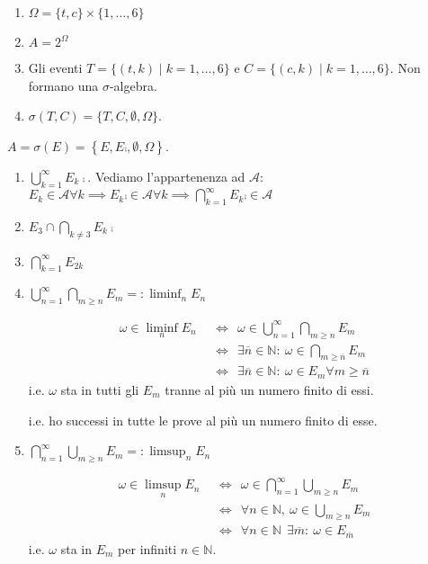 \Soluzione
\begin{enumerate}
\item $\Omega =\{t,c\} \times \{1,\dots ,6\}$
\item $A=2^{\Omega }$
\item Gli eventi $T=\{( t,k) \mid k=1,\dots ,6\}$ e $C=\{( c,k) \mid k=1,\dots ,6\}$. Non formano una $\sigma $-algebra.
\item $\sigma ( T,C) =\{T,C,\emptyset ,\Omega \}$.
\end{enumerate}
\Soluzione

$A=\sigma ( E) =\left\{E,E\comp ,\emptyset ,\Omega \right\}$.
\Soluzione
\begin{enumerate}
\item $\bigcup\limits _{k=1}^{\infty } E_{k}\comp$. Vediamo l'appartenenza ad $\mathcal{A}$: $E_{k} \in \mathcal{A} \forall k\implies  E_{k}\comp \in \mathcal{A} \forall k\implies  \bigcap\limits _{k=1}^{\infty } E_{k}\comp \in \mathcal{A}$
\item $E_{3} \cap \bigcap\limits _{k\neq 3} E_{k}\comp$
\item $\bigcap\limits _{k=1}^{\infty } E_{2k}$
\item $\bigcup\limits _{n=1}^{\infty }\bigcap\limits _{m\geq n} E_{m} =:\liminf _{n} E_{n}$

\begin{oss}
\begin{equation*}
\begin{aligned}
\omega \in \liminf _{n} E_{n} & \ \ \iff \ \ \omega \in \bigcup _{n=1}^{\infty }\bigcap _{m\geq n} E_{m}\\
 & \ \ \iff \ \ \exists \overline{n} \in \mathbb{N} :\ \omega \in \bigcap _{m\geq \overline{n}} E_{m}\\
 & \ \ \iff \ \ \exists \overline{n} \in \mathbb{N} :\ \omega \in E_{m} \forall m\geq \overline{n}
\end{aligned}
\end{equation*}
i.e. $\omega $ sta in tutti gli $E_{m}$ tranne al più un numero finito di essi.

i.e. ho successi in tutte le prove al più un numero finito di esse.
\end{oss}
\item $\bigcap\limits _{n=1}^{\infty }\bigcup\limits _{m\geq n} E_{m} =:\limsup _{n} E_{n}$

\begin{oss}
\begin{equation*}
\begin{aligned}
\omega \in \limsup _{n} E_{n} & \ \ \iff \ \ \omega \in \bigcap _{n=1}^{\infty }\bigcup _{m\geq n} E_{m}\\
 & \ \ \iff \ \ \forall n\in \mathbb{N} ,\ \omega \in \bigcup _{m\geq n} E_{m}\\
 & \ \ \iff \ \ \forall n\in \mathbb{N} \ \ \exists \overline{m} :\ \omega \in E_{\overline{m}}
\end{aligned}
\end{equation*}
i.e. $\omega $ sta in $E_{m}$ per infiniti $n\in \mathbb{N}$.


\end{oss}
\end{enumerate}

